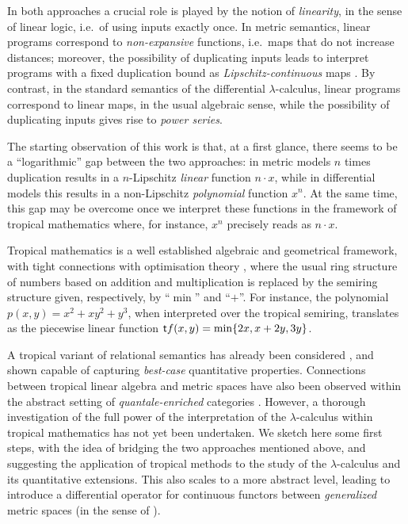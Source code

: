 \documentclass[submission,%
]{eptcs}
\begin{document}
In both approaches a crucial role is played by the notion of \emph{linearity}, in the sense of linear logic, i.e.~of using inputs exactly once. In metric semantics, linear programs correspond to \emph{non-expansive} functions, i.e.\ maps that do not increase distances; moreover, the possibility of duplicating inputs leads to interpret programs with a fixed duplication bound as \emph{Lipschitz-continuous} maps \cite{Gaboardi2017}.
By contrast, in the standard semantics of the differential $\lambda$-calculus, linear programs correspond to linear maps, in the usual algebraic sense, while the possibility of duplicating inputs gives rise to \emph{power series}.

The starting observation of this work is that, at a first glance, there seems to be a  ``logarithmic'' gap between the two approaches:
in metric models $n$ times duplication results in a $n$-Lipschitz \emph{linear} function $n\cdot x$, while in differential models this results in a non-Lipschitz \emph{polynomial} function $x^{n}$.
 At the same time, 
this gap may be overcome once we interpret these functions in the framework of tropical mathematics where, for instance, $x^{n}$ precisely reads as $n\cdot x$.

Tropical mathematics \cite{Simon} is a well established algebraic and geometrical framework, with tight connections with optimisation theory \cite{Sturmfelds}, where the usual ring structure of numbers based on addition and multiplication is replaced by the semiring structure given, respectively, by ``$\min$'' and ``$+$''.
For instance, the polynomial $p(x,y)=x^{2}+xy^{2}+y^{3}$, when interpreted over the tropical semiring, translates as the piecewise linear function
$
\mathsf{t} f(x,y)=\min\{2x, x+2y, 3y\}
$.

A tropical variant of relational semantics has already been considered \cite{Manzo2013}, and shown capable of capturing \emph{best-case} quantitative properties.
Connections between tropical linear algebra and metric spaces have also been observed \cite{Fuji} within the abstract setting of \emph{quantale-enriched} categories \cite{Hofmann2014, Stubbe2014}.
However, a thorough investigation of the full power of the interpretation of the $\lambda$-calculus within tropical mathematics has not yet been undertaken.
We sketch here some first steps, with the idea of bridging the two approaches mentioned above, and suggesting the application of tropical methods to the study of the $\lambda$-calculus and its quantitative extensions.
This also scales to a 
more abstract level, leading to introduce a differential operator for continuous functors between \emph{generalized} metric spaces (in the sense of \cite{Lawvere1973}).
\end{document}
